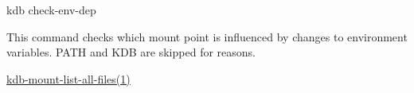 {\ttfamily kdb check-\/env-\/dep}

This command checks which mount point is influenced by changes to environment variables. {\ttfamily P\+A\+TH} and {\ttfamily K\+DB} are skipped for reasons.


\begin{DoxyItemize}
\item \hyperlink{doc_help_kdb-mount-list-all-files_md}{kdb-\/mount-\/list-\/all-\/files(1)} 
\end{DoxyItemize}